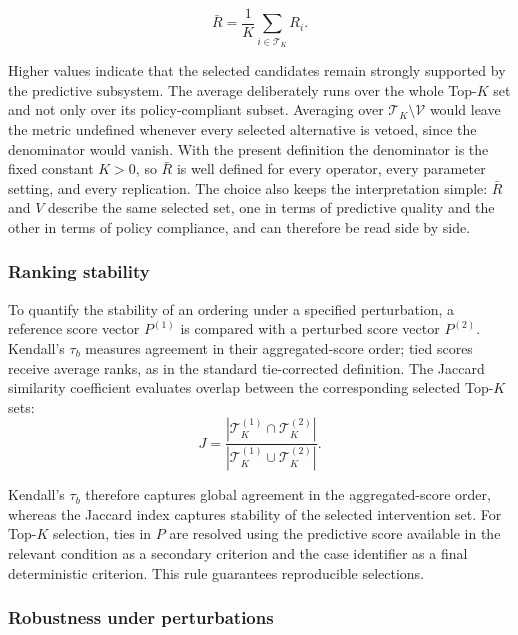 \documentclass[mathematics,article,submit,moreauthors]{Definitions/mdpi}
\begin{document}
\begin{equation}
\bar{R}
=
\frac{1}{K}
\sum_{i\in\mathcal{T}_K}
R_i.
\end{equation}

Higher values indicate that the selected candidates remain strongly
supported by the predictive subsystem.
{\color{teal}The average deliberately runs over the whole Top-$K$ set and
not only over its policy-compliant subset. Averaging over
$\mathcal{T}_K\setminus\mathcal{V}$ would leave the metric undefined
whenever every selected alternative is vetoed, since the denominator would
vanish. With the present definition the denominator is the fixed constant
$K>0$, so $\bar{R}$ is well defined for every operator, every parameter
setting, and every replication. The choice also keeps the interpretation
simple: $\bar{R}$ and $V$ describe the same selected set, one in terms of
predictive quality and the other in terms of policy compliance, and can
therefore be read side by side.}

\subsubsection{Ranking stability}

{\color{blue}To quantify the stability of an ordering under a specified
perturbation, {\color{teal}a reference score vector $P^{(1)}$ is compared
with a perturbed score vector $P^{(2)}$.} Kendall's $\tau_b$ measures agreement in
their aggregated-score order; tied scores receive average ranks, as in the
standard tie-corrected definition. The Jaccard similarity coefficient
evaluates overlap between the corresponding selected Top-$K$ sets:}
\begin{equation}
J=
\frac{|\mathcal{T}_K^{(1)}\cap\mathcal{T}_K^{(2)}|}{|\mathcal{T}_K^{(1)}\cup\mathcal{T}_K^{(2)}|}.
\end{equation}

{\color{blue}Kendall's $\tau_b$ therefore captures global agreement in the
aggregated-score order, whereas the Jaccard index captures stability of the
selected intervention set. For Top-$K$ selection, ties in $P$ are resolved
using the predictive score available in the relevant condition as a
secondary criterion and the case identifier as a final deterministic
criterion. This rule guarantees reproducible selections.}

\subsubsection{Robustness under perturbations}
\end{document}
